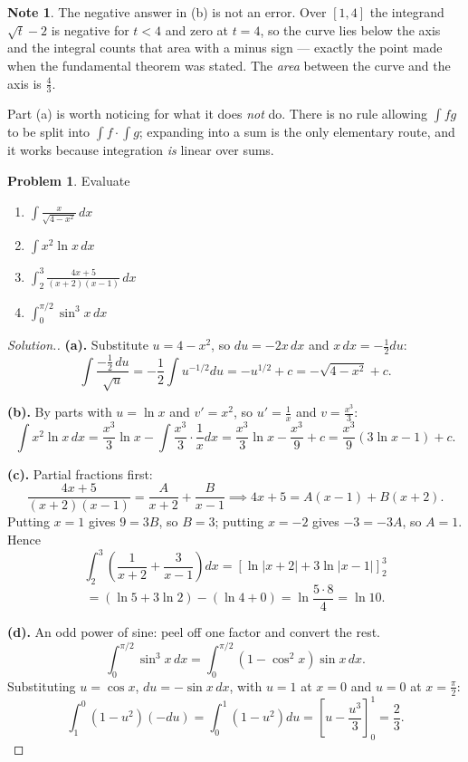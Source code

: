 \documentclass[11pt,a4paper]{article}
\theoremstyle{definition}
\newtheorem{note}[thm]{Note}
\newtheorem{problemx}{Problem}[section]
\newenvironment{problem}{\begin{problemx}}{\end{problemx}}
\newenvironment{solution}
  {\renewcommand{\qedsymbol}{}\begin{proof}[\textit{Solution}.]}
  {\end{proof}}
\begin{document}
\begin{note}
The negative answer in (b) is not an error. Over $[1,4]$ the integrand
$\sqrt{t}-2$ is negative for $t<4$ and zero at $t=4$, so the curve lies below the
axis and the integral counts that area with a minus sign --- exactly the point made
when the fundamental theorem was stated. The \emph{area} between the curve and the
axis is $\frac{4}{3}$.

Part (a) is worth noticing for what it does \emph{not} do. There is no rule
allowing $\int fg$ to be split into $\int f\cdot\int g$; expanding into a sum is
the only elementary route, and it works because integration \emph{is} linear over
sums.
\end{note}

\pagebreak

\begin{problem}
Evaluate
\begin{enumerate}
\item[(a).] $\displaystyle\int\frac{x}{\sqrt{4-x^{2}}}\,dx$
\item[(b).] $\displaystyle\int x^{2}\ln x\,dx$
\item[(c).] $\displaystyle\int^{3}_{2}\frac{4x+5}{(x+2)(x-1)}\,dx$
\item[(d).] $\displaystyle\int^{\pi/2}_{0}\sin^{3}x\,dx$
\end{enumerate}
\end{problem}

\begin{solution}
\textbf{(a).} Substitute $u=4-x^{2}$, so $du=-2x\,dx$ and $x\,dx=-\frac{1}{2}du$:
$$\int\frac{-\frac{1}{2}\,du}{\sqrt{u}}
=-\frac{1}{2}\int u^{-1/2}du=-u^{1/2}+c=-\sqrt{4-x^{2}}+c .$$

\textbf{(b).} By parts with $u=\ln x$ and $v'=x^{2}$, so $u'=\frac{1}{x}$ and
$v=\frac{x^{3}}{3}$:
$$\int x^{2}\ln x\,dx=\frac{x^{3}}{3}\ln x-\int\frac{x^{3}}{3}\cdot\frac{1}{x}dx
=\frac{x^{3}}{3}\ln x-\frac{x^{3}}{9}+c
=\frac{x^{3}}{9}\left(3\ln x-1\right)+c .$$

\textbf{(c).} Partial fractions first:
$$\frac{4x+5}{(x+2)(x-1)}=\frac{A}{x+2}+\frac{B}{x-1}
\implies 4x+5=A(x-1)+B(x+2).$$
Putting $x=1$ gives $9=3B$, so $B=3$; putting $x=-2$ gives $-3=-3A$, so $A=1$.
Hence
$$\int^{3}_{2}\left(\frac{1}{x+2}+\frac{3}{x-1}\right)dx
=\left[\ln\left|x+2\right|+3\ln\left|x-1\right|\right]^{3}_{2}$$
$$=\left(\ln 5+3\ln 2\right)-\left(\ln 4+0\right)
=\ln\frac{5\cdot 8}{4}=\ln 10 .$$

\textbf{(d).} An odd power of sine: peel off one factor and convert the rest.
$$\int^{\pi/2}_{0}\sin^{3}x\,dx=\int^{\pi/2}_{0}\left(1-\cos^{2}x\right)\sin x\,dx .$$
Substituting $u=\cos x$, $du=-\sin x\,dx$, with $u=1$ at $x=0$ and $u=0$ at
$x=\frac{\pi}{2}$:
$$\int^{0}_{1}\left(1-u^{2}\right)(-du)=\int^{1}_{0}\left(1-u^{2}\right)du
=\left[u-\frac{u^{3}}{3}\right]^{1}_{0}=\frac{2}{3}.$$
\end{solution}
\end{document}

